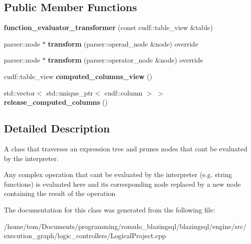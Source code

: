 \subsection*{Public Member Functions}
\begin{DoxyCompactItemize}
\item 
\mbox{\label{classral_1_1processor_1_1function__evaluator__transformer_a3c389ffcf498cb6a76a0dcd1959c34e9}} 
{\bfseries function\+\_\+evaluator\+\_\+transformer} (const cudf\+::table\+\_\+view \&table)
\item 
\mbox{\label{classral_1_1processor_1_1function__evaluator__transformer_a7cf33e05533d71d24ccac6510d1a35b2}} 
parser\+::node $\ast$ {\bfseries transform} (parser\+::operad\+\_\+node \&node) override
\item 
\mbox{\label{classral_1_1processor_1_1function__evaluator__transformer_abc3cddc8139b9a7a8d48712cc092c19e}} 
parser\+::node $\ast$ {\bfseries transform} (parser\+::operator\+\_\+node \&node) override
\item 
\mbox{\label{classral_1_1processor_1_1function__evaluator__transformer_a8084c67c14a0da853c6134ca3089b6cb}} 
cudf\+::table\+\_\+view {\bfseries computed\+\_\+columns\+\_\+view} ()
\item 
\mbox{\label{classral_1_1processor_1_1function__evaluator__transformer_a89644d653fd4601d224486e82589530d}} 
std\+::vector$<$ std\+::unique\+\_\+ptr$<$ cudf\+::column $>$ $>$ {\bfseries release\+\_\+computed\+\_\+columns} ()
\end{DoxyCompactItemize}


\subsection{Detailed Description}
A class that traverses an expression tree and prunes nodes that can\textquotesingle{}t be evaluated by the interpreter. 

Any complex operation that can\textquotesingle{}t be evaluated by the interpreter (e.\+g. string functions) is evaluated here and its corresponding node replaced by a new node containing the result of the operation 

The documentation for this class was generated from the following file\+:\begin{DoxyCompactItemize}
\item 
/home/tom/\+Documents/programming/romulo\+\_\+blazingsql/blazingsql/engine/src/execution\+\_\+graph/logic\+\_\+controllers/Logical\+Project.\+cpp\end{DoxyCompactItemize}
